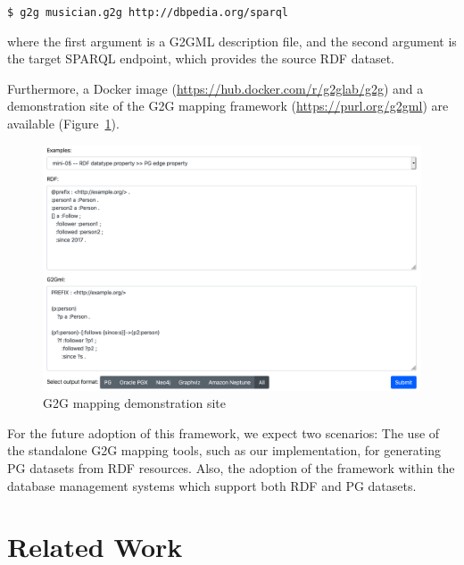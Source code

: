 \documentclass[runningheads]{llncs}
\begin{document}
\texttt{\$ g2g musician.g2g http://dbpedia.org/sparql}

\noindent where the first argument is a G2GML description file, and the second argument is the target SPARQL endpoint, which provides the source RDF dataset.

Furthermore, a Docker image (\url{https://hub.docker.com/r/g2glab/g2g}) and a demonstration site of the G2G mapping framework (\url{https://purl.org/g2gml}) are available (Figure~\ref{fig:sandbox}).

\begin{figure}
\center
\includegraphics[width=1.0\textwidth]{sandbox.png}
\caption{G2G mapping demonstration site}
\label{fig:sandbox}
\end{figure}

For the future adoption of this framework, we expect two scenarios: The use of the standalone G2G mapping tools, such as our implementation, for generating PG datasets from RDF resources. Also, the adoption of the framework within the database management systems which support both RDF and PG datasets.

\section{Related Work}
\end{document}
